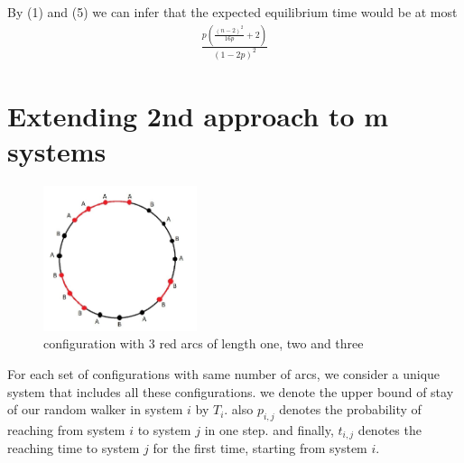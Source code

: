\documentclass[]{book}
\theoremstyle{definition}
\begin{document}
By (1) and (5) we can infer that the expected equilibrium time would be at most 
\begin{equation}\label{}
\begin{split}
    \frac{p\left( \frac{\left(n-2\right)^2}{16p} + 2\right)}{\left(1-2p\right)^2}
\end{split}
\end{equation}
\section{Extending 2nd approach to m systems}
\begin{figure}[ht]
    \centering
    \includegraphics[width=0.4\textwidth]{figures/3.jpg}
    \caption{configuration with 3 red arcs of length one, two and three}
    \label{fig:mesh1}
\end{figure}
For each set of configurations with same number of arcs, we consider a unique system that includes all these configurations. we denote the upper bound of stay of our random walker in system $i$ by \emph{$T_i$}. also \emph{$p_{i, j}$} denotes the probability of reaching from system $i$ to system $j$ in one step. and finally, \emph{$t_{i, j}$} denotes the reaching time to system $j$ for the first time, starting from system $i$.
\begin{center}
\end{center}
\end{document}

